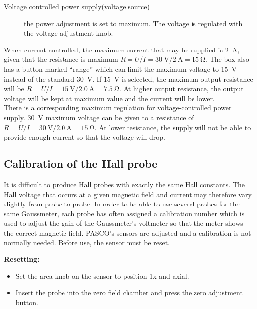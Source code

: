 \documentclass[../Elmag-labhefte-2020.tex]{subfiles}
\begin{document}
\begin{itemize}
\begin{description}
      \item[Voltage controlled power supply(voltage source)]  the power adjustment is set to maximum. The voltage is regulated with the voltage adjustment knob.
    \end{description}
    When current controlled, the maximum current that may be supplied is \SI{2}{\ampere}, given that the  resistance is maximum $R = U/I = \SI{30}{\volt} / \SI{2}{\ampere} = \SI{15}{\ohm}$.
    The box also has a button marked ``range'' which can limit the maximum voltage to \SI{15}{\volt} instead of the standard \SI{30}{\volt}. If \SI{15}{\volt} is selected, the maximum output resistance will be $R = U/I = \SI{15}{\volt} / \SI{2.0}{\ampere} = \SI{7.5}{\ohm}$. At higher output resistance, the output voltage will be kept at maximum value and the current will be lower.\\

    There is a corresponding maximum regulation for voltage-controlled power supply. \SI{30}{\volt} maximum voltage can be given to a resistance of $R = U/I = \SI{30}{\volt} / \SI{2.0}{\ampere} = \SI{15}{\ohm}$. At lower resistance, the supply will not be able to provide enough current so that the voltage will drop.
\end{itemize}

\subsection{Calibration of the Hall probe}

It is difficult to produce Hall probes with exactly the same Hall constants. The Hall voltage that occurs at a given magnetic field and current may therefore vary slightly from probe to probe. In order to be able to use several probes for the same Gaussmeter, each probe has often assigned a calibration number which is used to adjust the gain of the Gaussmeter's voltmeter so that the meter shows the correct magnetic field. PASCO's sensors are adjusted and a calibration is not normally needed. Before use, the sensor must be reset.

\textbf{Resetting:}
\vspace{-4mm}
\begin{itemize}
    \item Set the area knob on the sensor to position 1x and axial.
    \item Insert the probe into the zero field chamber and press the zero adjustment button.
\end{itemize}
\end{document}
